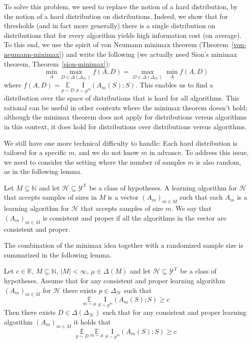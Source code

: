 \documentclass[final,12pt]{colt2018}
\newcommand{\EE}[1]{\underset{#1}{\mathbb{E}}}
\newcommand{\mc}[1]{\mathcal{#1}}
\newcommand{\mb}{\mathbb}
\newcommand{\cH}{\mc{H}}
\newcommand{\cX}{\mc{X}}
\newcommand{\cY}{\mc{Y}}
\newcommand{\I}[2]{\underset{#1}{\mathrm{I}}\left(#2\right)}
\begin{document}
To solve this problem, we need to replace the notion of a hard distribution,
by the notion of a hard distribution on distributions.
Indeed, we show that for thresholds (and in fact more generally)
there is a single distribution on distributions that
for every algorithm yields high information cost (on average).
To this end, we use the spirit of von Neumann minimax theorem (Theorem~\ref{von-neumann-minimax}) and write the following (we actually need Sion's minimax theorem, Theorem~\ref{sion-minimax}):
\[
\min_{A}\max_{D\in\Delta(\Delta_{\cH})} f(A,D) = \max_{D\in\Delta(\Delta_{\cH})}\min_{A} f(A,D)
\]
where 
$
f(A,D) = \EE{p \sim D} \: \I{S \sim p^m}{A_m(S);S}
$.
This enables us to find a distribution over the space of distributions that is hard for all algorithms. 
This rational can be useful in other contexts where the minimax theorem doesn't hold;
although the minimax theorem does not apply for distributions versus algorithms in this context,
it does hold for distributions over distributions versus algorithms.

{
We still have one more technical difficulty to handle: Each hard distribution is tailored for a specific $m$, and we do not know $m$ in advance. To address this issue, we need to consider the setting where the number of samples $m$ is also random, as in the following lemma. 
}
\begin{definition}
	Let $M \subseteq \mb{N}$ and let $\cH \subseteq \cY^\cX$ be a class of hypotheses. A learning algorithm for $\cH$ that accepts samples of sizes in $M$ is a vector
$\left(A_m\right)_{m\in M}$ such that each $A_m$ is a learning algorithm for $\cH$ that accepts samples of size $m$. We say that $\left(A_m\right)_{m\in M}$ is consistent and proper if all the algorithms in the vector are consistent and proper.
\end{definition}


The combination of the minimax idea together with a randomized sample size is summarized in the following lemma.

\begin{lemma}\label{lemma-global-distribution-extended}
	Let $c\in\mathbb{R}$, $M \subseteq \mb{N}$, $|M|<\infty$, $\mu\in\Delta(M)$ and let $\cH \subseteq \cY^\cX$ be a class of hypotheses. Assume that for any consistent and proper learning algorithm $\left(A_m\right)_{m\in M}$ for $\cH$ there exists $p \in \Delta_{\cH}$ such that 
	\[
	\EE{m \sim \mu} \: \I{S \sim p^m}{A_m(S);S} \geq c
	\]
		Then there exists $D \in \Delta(\Delta_{\cH})$ such that for any consistent and proper learning algorithm $\left(A_m\right)_{m\in M}$ it holds that
	\[
	\EE{p \sim D} \: \EE{m \sim \mu} \: \I{S \sim p^m}{A_m(S);S} \geq c
	\]
\end{lemma}
 
\end{document}
